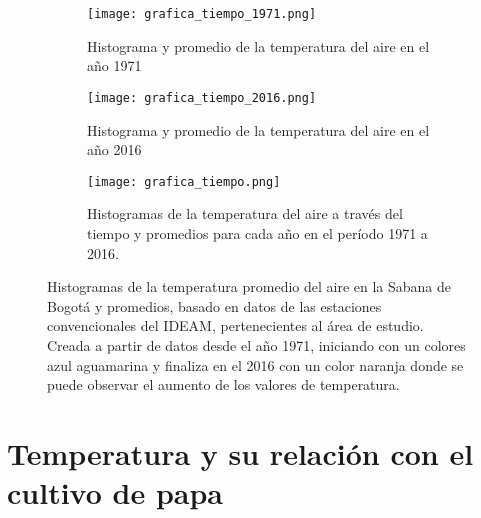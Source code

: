 \begin{figure}[H]
	
	\begin{subfigure}[b]{\linewidth}
	\begin{center}
	\texttt{[image: grafica\_tiempo\_1971.png]}
		
		\caption{Histograma y promedio de la temperatura del aire en el año 1971}		
		\label{graph:histo_tiempo_1971}
		
	\end{center}
	\end{subfigure}

		
	\begin{subfigure}[b]{\linewidth}
	\begin{center}
	\texttt{[image: grafica\_tiempo\_2016.png]}
		
		\caption{Histograma y promedio de la temperatura del aire en el año 2016}		
		\label{graph:histo_tiempo_2016}
		
	\end{center}
	\end{subfigure}
    
    \begin{subfigure}[b]{\linewidth}
	\begin{center}
	\texttt{[image: grafica\_tiempo.png]}
		
		\caption{Histogramas de la temperatura del aire a través del tiempo y promedios para cada año en el período 1971 a 2016.}		
		\label{graph:histo_tiempo}
		
	\end{center}
	\end{subfigure}
	
	
	\caption{Histogramas de la temperatura promedio del aire en la Sabana de Bogotá y promedios, basado en datos de las estaciones convencionales del IDEAM, pertenecientes al área de estudio. Creada a partir de datos desde el año 1971, iniciando con un colores azul aguamarina y finaliza en el 2016 con un color naranja donde se puede observar el aumento de los valores de temperatura.}		
	\label{graph:evol_tmp_sabana} 
		
\end{figure}

\section{Temperatura y su relación con el cultivo de papa}

